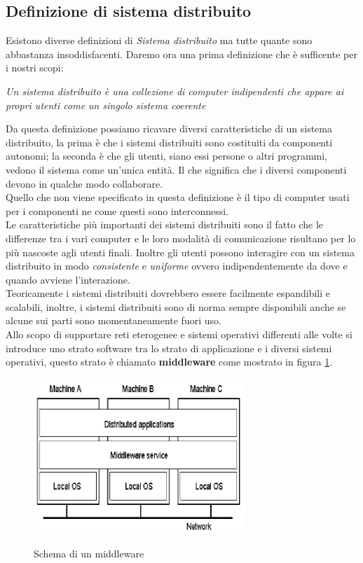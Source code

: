 \subsection{Definizione di sistema distribuito}
Esistono diverse definizioni di \emph{Sistema distribuito} ma tutte quante sono abbastanza insoddisfacenti. Daremo ora una prima definizione che è sufficente per i nostri scopi:
\begin{center}
\emph{Un sistema distribuito è una collezione di computer indipendenti che appare ai propri utenti come un singolo sistema coerente}
\end{center}
Da questa definizione possiamo ricavare diversi caratteristiche di un sistema distribuito, la prima è che i sistemi distribuiti sono costituiti da componenti autonomi; la seconda è che gli utenti, siano essi persone o altri programmi, vedono il sistema come un'unica entità. Il che significa che i diversi componenti devono in qualche modo collaborare.\\
Quello che non viene specificato in questa definizione è il tipo di computer usati per i componenti ne come questi sono interconnessi.\\
Le caratteristiche più importanti dei sistemi distribuiti sono il fatto che le differenze tra i vari computer e le loro modalità di comunicazione risultano per lo più nascoste agli utenti finali. Inoltre gli utenti possono interagire con un sistema distribuito in modo \emph{consistente} e \emph{uniforme} ovvero indipendentemente da dove e quando avviene l'interazione.\\
Teoricamente i sistemi distribuiti dovrebbero essere facilmente espandibili e scalabili, inoltre, i sistemi distribuiti sono di norma sempre disponibili anche se alcune sui parti sono momentaneamente fuori uso.\\
Allo scopo di supportare reti eterogenee e sistemi operativi differenti alle volte si introduce uno strato software tra lo strato di applicazione e i diversi sistemi operativi, questo strato è chiamato \textbf{middleware} come mostrato in figura \ref{fig:midd}.
\begin{figure}[htb]
\centering
\includegraphics[width=8cm]{img/schemamidd.png}\\
\caption{Schema di un middleware}\label{fig:midd}
\end{figure}
